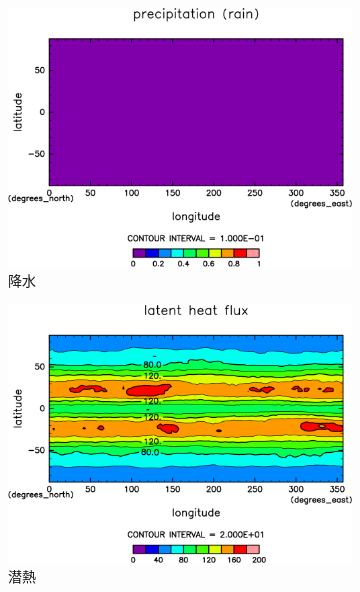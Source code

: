 \documentclass[body]{subfiles}
\begin{document}
\begin{figure}[t]
\begin{subfigure}{.4\textwidth}
		\includegraphics[width=\columnwidth]{S1600/Rain,time=3650:4015-crop-rotate.pdf}
		\caption{降水\hmu*{[W/m^{-2}]}}\label{S1600降水}
	\end{subfigure}
	\begin{subfigure}{.4\textwidth}
		\centering
		\includegraphics[width=\columnwidth]{S1600/Evap,time=3650:4015-crop-rotate.pdf}
		\caption{潜熱\hmu*{[W/m^{-2}]}}\label{S1600潜熱}
	\end{subfigure}
	\begin{subfigure}{.4\textwidth}
		\centering

\end{subfigure}
\end{figure}
\end{document}
